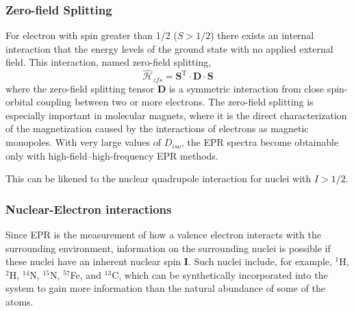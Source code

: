 \subsubsection*{Zero-field Splitting}
For electron with spin greater than 1/2 ($S > 1/2$) there exists an internal interaction that the energy levels of the ground state with no applied external field. This interaction, named zero-field splitting, 
\begin{equation}
    \hat{\mathcal{H}}_{zfs} = \mathbf{S}^{\text{T} } \cdot \mathbf{D} \cdot \mathbf{S}
\end{equation}
where the zero-field splitting tensor $\mathbf{D}$ is a symmetric interaction from close spin-orbital coupling between two or more electrons. The zero-field splitting is especially important in molecular magnets, where it is the direct characterization of the magnetization caused by the interactions of electrons as magnetic monopoles. \cite{barra1998high} With very large values of $D_{iso}$, the EPR spectra become obtainable only with high-field--high-frequency EPR methods. \cite{Nehrkorn13} 

This can be likened to the nuclear quadrupole interaction for nuclei with $I > 1/2$.

\subsubsection*{Nuclear-Electron interactions}
Since EPR is the measurement of how a valence electron interacts with the surrounding environment, information on the surrounding nuclei is possible if these nuclei have an inherent nuclear spin $\mathbf{I}$. Such nuclei include, for example, $^1$H, $^2$H, $^14$N, $^15$N, $^57$Fe, and $^13$C, which can be synthetically incorporated into the system to gain more information than the natural abundance of some of the atoms. \cite{Doorslaer2007,Harmer2009,CUTSAIL20151370}

